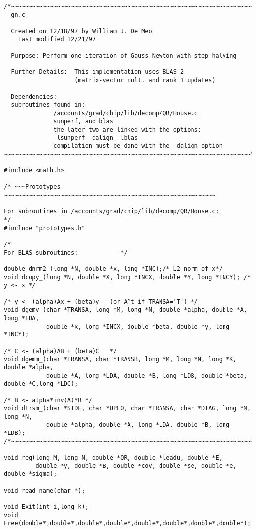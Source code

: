 \documentclass{article}
\begin{document}
{\begin{verbatim}
/*~~~~~~~~~~~~~~~~~~~~~~~~~~~~~~~~~~~~~~~~~~~~~~~~~~~~~~~~~~~~~~~~~~~~~~
  gn.c

  Created on 12/18/97 by William J. De Meo
    Last modified 12/21/97

  Purpose: Perform one iteration of Gauss-Newton with step halving
           
  Further Details:  This implementation uses BLAS 2
                    (matrix-vector mult. and rank 1 updates)

  Dependencies:                   
  subroutines found in:
              /accounts/grad/chip/lib/decomp/QR/House.c
              sunperf, and blas
              the later two are linked with the options:
              -lsunperf -dalign -lblas
              compilation must be done with the -dalign option
~~~~~~~~~~~~~~~~~~~~~~~~~~~~~~~~~~~~~~~~~~~~~~~~~~~~~~~~~~~~~~~~~~~~~~*/

#include <math.h>

/* ~~~Prototypes ~~~~~~~~~~~~~~~~~~~~~~~~~~~~~~~~~~~~~~~~~~~~~~~~~~~~~~~~~~~~

For subroutines in /accounts/grad/chip/lib/decomp/QR/House.c:            */
#include "prototypes.h"

/* 
For BLAS subroutines:            */
 
double dnrm2_(long *N, double *x, long *INC);/* L2 norm of x*/
void dcopy_(long *N, double *X, long *INCX, double *Y, long *INCY); /* y <- x */

/* y <- (alpha)Ax + (beta)y   (or A^t if TRANSA='T') */
void dgemv_(char *TRANSA, long *M, long *N, double *alpha, double *A, long *LDA, 
            double *x, long *INCX, double *beta, double *y, long *INCY);

/* C <- (alpha)AB + (beta)C   */
void dgemm_(char *TRANSA, char *TRANSB, long *M, long *N, long *K, double *alpha, 
            double *A, long *LDA, double *B, long *LDB, double *beta, double *C,long *LDC); 

/* B <- alpha*inv(A)*B */
void dtrsm_(char *SIDE, char *UPLO, char *TRANSA, char *DIAG, long *M, long *N,
            double *alpha, double *A, long *LDA, double *B, long *LDB);
/*~~~~~~~~~~~~~~~~~~~~~~~~~~~~~~~~~~~~~~~~~~~~~~~~~~~~~~~~~~~~~~~~~~~~~~*/

void reg(long M, long N, double *QR, double *leadu, double *E, 
         double *y, double *B, double *cov, double *se, double *e, double *sigma);

void read_name(char *);

void Exit(int i,long k);
void Free(double*,double*,double*,double*,double*,double*,double*,double*);


\end{verbatim}}
\end{document}
